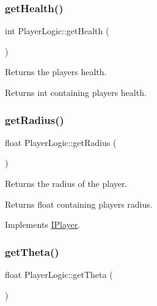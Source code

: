 \subsubsection{\texorpdfstring{get\+Health()}{getHealth()}}
{\footnotesize\ttfamily int Player\+Logic\+::get\+Health (\begin{DoxyParamCaption}{ }\end{DoxyParamCaption})}



Returns the players health. 

\begin{DoxyReturn}{Returns}
int containing player\textquotesingle{}s health. 
\end{DoxyReturn}
\mbox{\label{class_player_logic_a2ca2c54d1e07bfc40a08b5c55403af3a}} 
\subsubsection{\texorpdfstring{get\+Radius()}{getRadius()}}
{\footnotesize\ttfamily float Player\+Logic\+::get\+Radius (\begin{DoxyParamCaption}{ }\end{DoxyParamCaption})\hspace{0.3cm}{\ttfamily [virtual]}}



Returns the radius of the player. 

\begin{DoxyReturn}{Returns}
float containing players radius. 
\end{DoxyReturn}


Implements \hyperlink{class_i_player}{I\+Player}.

\mbox{\label{class_player_logic_a7ea2f59ddde028b5451ddbe60453de1c}} 
\subsubsection{\texorpdfstring{get\+Theta()}{getTheta()}}
{\footnotesize\ttfamily float Player\+Logic\+::get\+Theta (\begin{DoxyParamCaption}{ }\end{DoxyParamCaption})\hspace{0.3cm}{\ttfamily [virtual]}}




